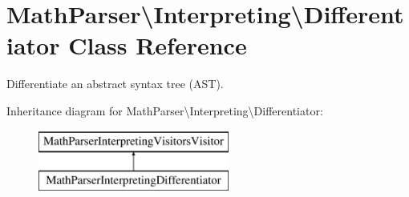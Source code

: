 \hypertarget{classMathParser_1_1Interpreting_1_1Differentiator}{\section{Math\-Parser\textbackslash{}Interpreting\textbackslash{}Differentiator Class Reference}
\label{classMathParser_1_1Interpreting_1_1Differentiator}
}


Differentiate an abstract syntax tree (A\-S\-T).  


Inheritance diagram for Math\-Parser\textbackslash{}Interpreting\textbackslash{}Differentiator\-:\begin{figure}[H]
\begin{center}
\leavevmode
\includegraphics[height=2.000000cm]{classMathParser_1_1Interpreting_1_1Differentiator}
\end{center}
\end{figure}
